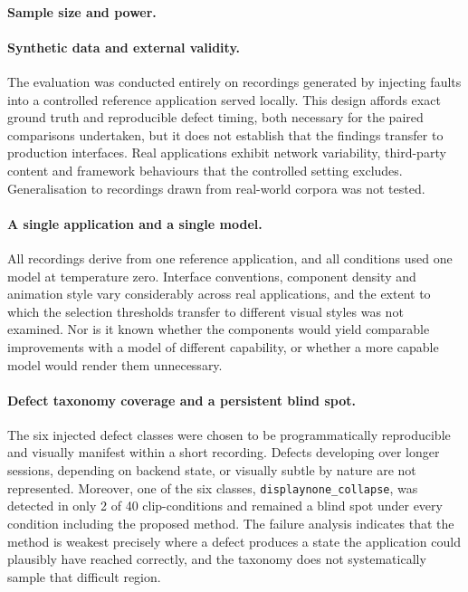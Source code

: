 \paragraph{Sample size and power.}

\paragraph{Synthetic data and external validity.}
The evaluation was conducted entirely on recordings generated by injecting
faults into a controlled reference application served locally. This design
affords exact ground truth and reproducible defect timing, both necessary
for the paired comparisons undertaken, but it does not establish that the
findings transfer to production interfaces. Real applications exhibit
network variability, third-party content and framework behaviours that the
controlled setting excludes. Generalisation to recordings drawn from
real-world corpora was not tested.

\paragraph{A single application and a single model.}
All recordings derive from one reference application, and all conditions
used one model at temperature zero. Interface conventions, component
density and animation style vary considerably across real applications,
and the extent to which the selection thresholds transfer to different
visual styles was not examined. Nor is it known whether the components
would yield comparable improvements with a model of different capability,
or whether a more capable model would render them unnecessary.

\paragraph{Defect taxonomy coverage and a persistent blind spot.}
The six injected defect classes were chosen to be programmatically
reproducible and visually manifest within a short recording. Defects
developing over longer sessions, depending on backend state, or visually
subtle by nature are not represented. Moreover, one of the six classes,
\texttt{displaynone\_collapse}, was detected in only 2 of 40
clip-conditions and remained a blind spot under every condition including
the proposed method. The failure analysis indicates that the method is
weakest precisely where a defect produces a state the application could
plausibly have reached correctly, and the taxonomy does not systematically
sample that difficult region.

